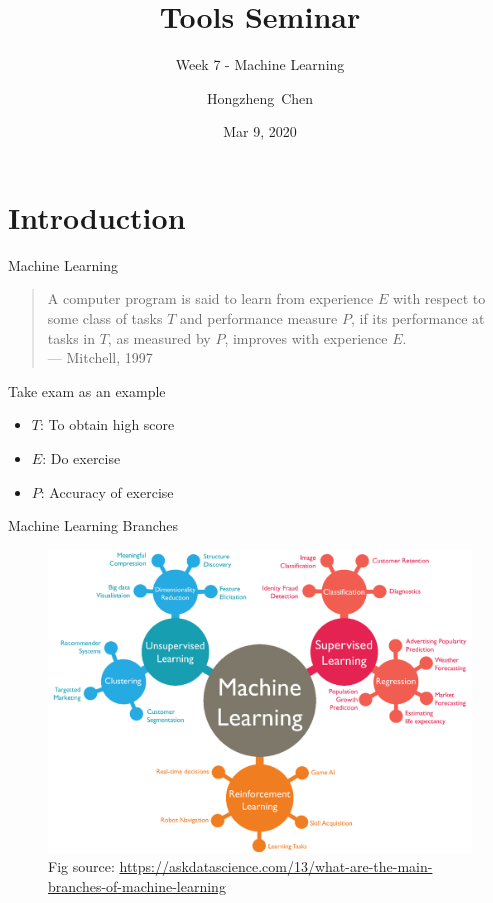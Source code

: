 \documentclass{../TexTemplate/myslide}
\title[ToolsSeminar]{Tools Seminar}
\subtitle{Week 7 - Machine Learning}
\author[chhzh123]{Hongzheng~Chen}
\date[Mar 9, 2020]{Mar 9, 2020}
\begin{document}
\begin{frame}
\titlepage
\end{frame}

\begin{frame}
\tableofcontents
\end{frame}

\section{Introduction}
\begin{frame}
\sectionpage
\end{frame}

\begin{frame}{Machine Learning}
\begin{quote}
A computer program is said to learn from experience $E$ with respect to some class of tasks $T$ and performance measure $P$,
if its performance at tasks in $T$, as measured by $P$, improves with experience $E$.\\
\hfill--- Mitchell, 1997
\end{quote}
\bigskip
Take exam as an example
\begin{itemize}
	\item $T$: To obtain high score
	\item $E$: Do exercise
	\item $P$: Accuracy of exercise
\end{itemize}
\end{frame}

\begin{frame}{Machine Learning Branches}
\begin{figure}[H]
\centering
\includegraphics[width=0.8\linewidth]{fig/ml_branches.png}
\caption*{\small Fig source: \url{https://askdatascience.com/13/what-are-the-main-branches-of-machine-learning}}
\end{figure}
\end{frame}
\end{document}
